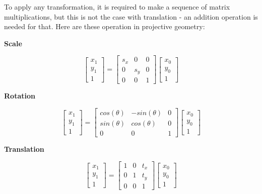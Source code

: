 To apply any transformation, it is required to make a sequence of matrix multiplications, but this is not the case with translation - an addition operation is needed for that. Here are these operation in projective geometry:

\begin{center}
    \textbf{Scale}
\end{center}
$$
\begin{bmatrix}
    x_1 \\ y_1 \\ 1
\end{bmatrix} = 
\begin{bmatrix}
    s_x & 0 & 0\\
    0 & s_y & 0\\
    0 & 0 & 1
\end{bmatrix}
\begin{bmatrix}
    x_0 \\ y_0 \\ 1
\end{bmatrix}
$$ 
\begin{center}
    \textbf{Rotation}    
\end{center}
$$
\begin{bmatrix}
    x_1 \\ y_1 \\ 1
\end{bmatrix} = 
\begin{bmatrix}
    cos(\theta) & -sin(\theta) & 0 \\
    sin(\theta) & cos(\theta)  & 0 \\
    0 & 0 & 1
\end{bmatrix}
\begin{bmatrix}
    x_0 \\ y_0 \\ 1
\end{bmatrix}
$$
\begin{center}
    \textbf{Translation}    
\end{center}
$$
\begin{bmatrix}
    x_1 \\ y_1 \\ 1
\end{bmatrix} = 
\begin{bmatrix}
    1 & 0 & t_x\\
    0 & 1 & t_y\\
    0 & 0 & 1
\end{bmatrix}
\begin{bmatrix}
    x_0 \\ y_0 \\ 1
\end{bmatrix}
$$ 

